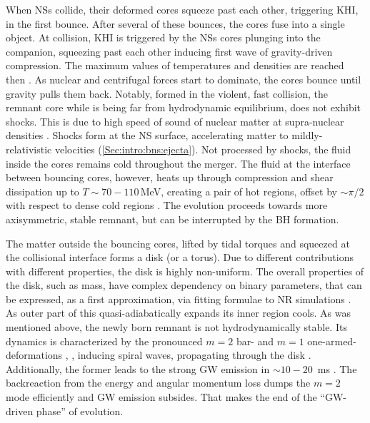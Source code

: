 When \acp{NS} collide, their deformed cores squeeze past each other, triggering \ac{KHI},
in the first bounce. After several of these bounces, the cores fuse into a single object.
At collision, \ac{KHI} is triggered by the \acp{NS} cores plunging into the companion,
squeezing past each other inducing first wave of gravity-driven compression. 
The maximum values of temperatures and densities are reached then \cite{Perego:2019adq}. As 
nuclear and centrifugal forces start to dominate, the cores bounce until gravity 
pulls them back. 
Notably, formed in the violent, fast collision, the remnant core while is being far from 
hydrodynamic equilibrium, does not exhibit shocks. This is due to high speed of sound 
of nuclear matter at supra-nuclear densities 
.
Shocks form at the \ac{NS} surface, accelerating matter to mildly-relativistic velocities 
(\ref{Sec:intro:bns:ejecta}).
Not processed by shocks, the fluid inside the cores remains cold 
throughout the merger. The fluid at the interface between bouncing cores, however,
heats up through compression and shear dissipation 
up to $T\sim70-110\,$MeV, creating a pair of hot regions, offset by $\sim\pi/2$ with 
respect to dense cold regions \cite{Kastaun:2016yaf}.
%
The evolution proceeds towards more axisymmetric, stable remnant, but can be 
interrupted by the \ac{BH} formation. 

The matter outside the bouncing cores, lifted by tidal torques and squeezed at the 
collisional interface forms a disk (or a torus).
Due to different contributions with different properties, the disk is highly non-uniform.
The overall properties of the disk, such as mass, have complex dependency on 
binary parameters, that can be expressed, as a first approximation, via fitting 
formulae to \ac{NR} simulations \cite{Radice:2017lry,Radice:2018xqa,Radice:2018ozg}. 
As outer part of this quasi-adiabatically expands 
its inner region cools. 
%
As was mentioned above, the newly born remnant is not hydrodynamically stable. 
Its dynamics is characterized by the pronounced $m=2$ bar- and $m=1$ one-armed-
deformations \cite{}, , inducing spiral waves, propagating through the 
disk . Additionally, the former leads to the strong \ac{GW} emission 
in $\sim10-20$~ms \pmerg{}. The backreaction from the energy and angular momentum 
loss dumps the $m=2$ mode efficiently and \ac{GW} emission subsides. 
That makes the end of the ``\ac{GW}-driven phase'' of \pmerg{} evolution. 


